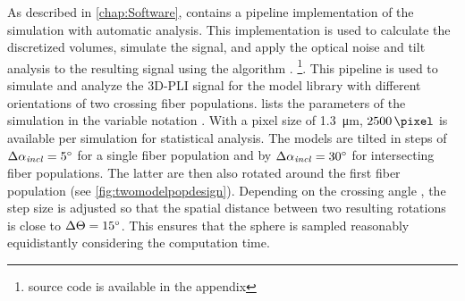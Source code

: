 %
%
%
As described in \cref{chap:Software}, \fastpli{} contains a pipeline implementation of the simulation with automatic analysis.
This implementation is used to calculate the discretized volumes, simulate the signal, and apply the optical noise and tilt analysis to the resulting signal using the algorithm \rofl{}. \footnote{source code is available in the appendix \dummy{}}.
This pipeline is used to simulate and analyze the \ac{3D-PLI} signal for the model library with different orientations of two crossing fiber populations.
 lists the parameters of the simulation in the variable notation \fastpli{}.
With a pixel size of \SI{1.3}{\micro\meter}, $\SI{2500}{\pixel}$ is available per simulation for statistical analysis.
The models are tilted in steps of $\Delta \textnormal{$\alpha_{\mathit{incl}}$} = \SI{5}{\degree}$ for a single fiber population and by $\Delta \textnormal{$\alpha_{\mathit{incl}}$} = \SI{30}{\degree}$ for intersecting fiber populations. The latter are then also rotated around the first fiber population (see \cref{fig:twomodelpopdesign}).
Depending on the crossing angle \modelOmega{}, the step size is adjusted so that the spatial distance between two resulting rotations is close to $\Delta \textnormal{$\Theta$} = \SI{15}{\degree}$.
This ensures that the sphere is sampled reasonably equidistantly considering the computation time.
%
%
%
